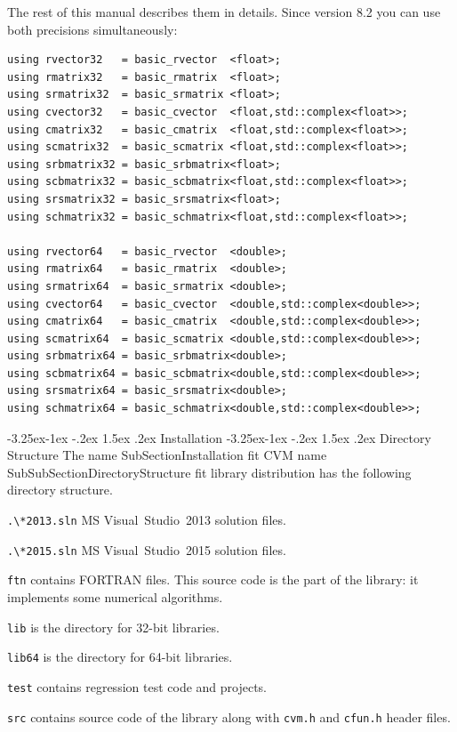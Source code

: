 \documentclass[12pt,letterpaper]{article}
\makeatletter
\newcommand{\FORTRAN}{\textsf{FORTRAN}\xspace}
\renewcommand\subsection{\@startsection{subsection}{2}{0mm}%
                                     {-3.25ex\@plus -1ex \@minus -.2ex}%
                                     {1.5ex \@plus .2ex}%
                                     {\normalfont\large\bfseries\sffamily}}
\renewcommand\subsubsection{\@startsection{subsubsection}{3}{0mm}%
                                     {-3.25ex\@plus -1ex \@minus -.2ex}%
                                     {1.5ex \@plus .2ex}%
                                     {\normalfont\normalsize\bfseries\sffamily}}
\makeatother
\begin{document}
The rest of this manual describes them in details.
Since version 8.2 you can use both precisions simultaneously:

\begin{Verbatim}
using rvector32   = basic_rvector  <float>;
using rmatrix32   = basic_rmatrix  <float>;
using srmatrix32  = basic_srmatrix <float>;
using cvector32   = basic_cvector  <float,std::complex<float>>;
using cmatrix32   = basic_cmatrix  <float,std::complex<float>>;
using scmatrix32  = basic_scmatrix <float,std::complex<float>>;
using srbmatrix32 = basic_srbmatrix<float>;
using scbmatrix32 = basic_scbmatrix<float,std::complex<float>>;
using srsmatrix32 = basic_srsmatrix<float>;
using schmatrix32 = basic_schmatrix<float,std::complex<float>>;

using rvector64   = basic_rvector  <double>;
using rmatrix64   = basic_rmatrix  <double>;
using srmatrix64  = basic_srmatrix <double>;
using cvector64   = basic_cvector  <double,std::complex<double>>;
using cmatrix64   = basic_cmatrix  <double,std::complex<double>>;
using scmatrix64  = basic_scmatrix <double,std::complex<double>>;
using srbmatrix64 = basic_srbmatrix<double>;
using scbmatrix64 = basic_scbmatrix<double,std::complex<double>>;
using srsmatrix64 = basic_srsmatrix<double>;
using schmatrix64 = basic_schmatrix<double,std::complex<double>>;
\end{Verbatim}




\subsection{Installation}
\subsubsection{Directory Structure}
The%
\pdfdest name {SubSectionInstallation} fit{}
CVM%
\pdfdest name {SubSubSectionDirectoryStructure} fit{}
library distribution has the following directory structure.
\begin{compactitem}
\item \verb".\*2013.sln" MS Visual~Studio~2013 solution files.
\item \verb".\*2015.sln" MS Visual~Studio~2015 solution files.
\item \verb"ftn" contains \FORTRAN{} files.
This source code
is the part of the library: it implements some
numerical algorithms.
\item \verb"lib" is the directory for 32-bit libraries.
\item \verb"lib64" is the directory for 64-bit libraries.
\item \verb"test" contains regression test code and projects.
\item \verb"src" contains source code of the library
along with \verb"cvm.h" and \verb"cfun.h" header files.
\end{compactitem}
\end{document}
